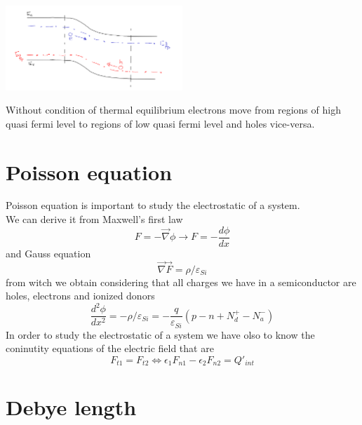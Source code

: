 \centering
\includegraphics[width=0.5\textwidth]{bandsgeo2.png}\\
\raggedright

Without condition of thermal equilibrium electrons move from regions of high quasi fermi level to regions of low quasi fermi level and holes vice-versa.
\section{Poisson equation}
Poisson equation is important to study the electrostatic of a system.\\
We can derive it from Maxwell's first law 
\begin{equation}
F=-\overrightarrow{\nabla}\phi\rightarrow F=-\frac{d\phi}{dx}
\end{equation}
and Gauss equation
\begin{equation}
\overrightarrow{\nabla}\overrightarrow{F}=\rho/\varepsilon_{Si}
\end{equation}
from witch we obtain considering that all charges we have in a semiconductor are holes, electrons and ionized donors 
\begin{equation}
\frac{d^2\phi}{dx^2}=-\rho/\varepsilon_{Si}=-\frac{q}{\varepsilon_{Si}}(p-n+N_d^+-N_a^-)
\end{equation}
In order to study the electrostatic of a system we have olso to know the coninutity equations of the electric field that are
\begin{equation}
F_{t1}=F_{t2} \Longleftrightarrow \epsilon_1F_{n1}-\epsilon_2F_{n2}=Q'_{int}
\end{equation}
\newline
\section{Debye length}

